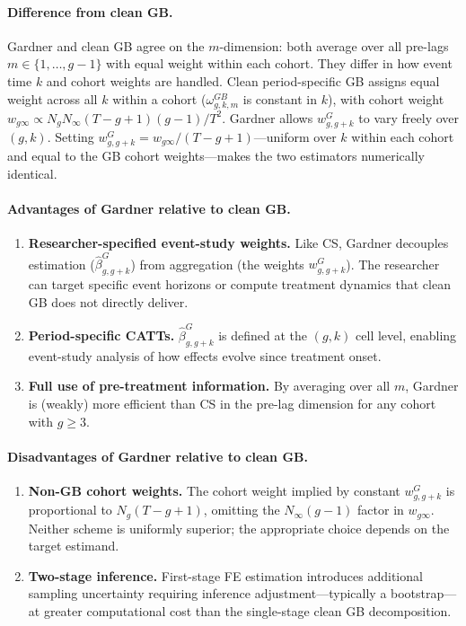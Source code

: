 \documentclass[12pt,letterpaper]{article}
\theoremstyle{remark}
\theoremstyle{definition}
\newcommand{\hbeta}{\hat{\beta}}
\begin{document}
\paragraph{Difference from clean GB.}
Gardner and clean GB agree on the $m$-dimension: both average over all pre-lags
$m\in\{1,\ldots,g-1\}$ with equal weight within each cohort. They differ in
how event time $k$ and cohort weights are handled. Clean period-specific GB
assigns equal weight across all $k$ within a cohort ($\omega^{GB}_{g,k,m}$
is constant in $k$), with cohort weight $w_{g\infty}\propto
N_gN_\infty(T-g+1)(g-1)/T^2$. Gardner allows $w^G_{g,g+k}$ to vary
freely over $(g,k)$. Setting $w^G_{g,g+k}=w_{g\infty}/(T-g+1)$---uniform
over $k$ within each cohort and equal to the GB cohort weights---makes the
two estimators numerically identical.

\paragraph{Advantages of Gardner relative to clean GB.}
\begin{enumerate}
  \item \textbf{Researcher-specified event-study weights.} Like CS, Gardner
    decouples estimation ($\hbeta^G_{g,g+k}$) from aggregation (the weights
    $w^G_{g,g+k}$). The researcher can target specific event horizons or
    compute treatment dynamics that clean GB does not directly deliver.
  \item \textbf{Period-specific CATTs.} $\hbeta^G_{g,g+k}$ is defined at the
    $(g,k)$ cell level, enabling event-study analysis of how effects evolve
    since treatment onset.
  \item \textbf{Full use of pre-treatment information.} By averaging over all
    $m$, Gardner is (weakly) more efficient than CS in the pre-lag dimension
    for any cohort with $g\geq3$.
\end{enumerate}

\paragraph{Disadvantages of Gardner relative to clean GB.}
\begin{enumerate}
  \item \textbf{Non-GB cohort weights.} The cohort weight implied by constant
    $w^G_{g,g+k}$ is proportional to $N_g(T-g+1)$, omitting the
    $N_\infty(g-1)$ factor in $w_{g\infty}$. Neither scheme is uniformly
    superior; the appropriate choice depends on the target estimand.
  \item \textbf{Two-stage inference.} First-stage FE estimation introduces
    additional sampling uncertainty requiring inference adjustment---typically
    a bootstrap---at greater computational cost than the single-stage clean GB
    decomposition.
\end{enumerate}
\end{document}
